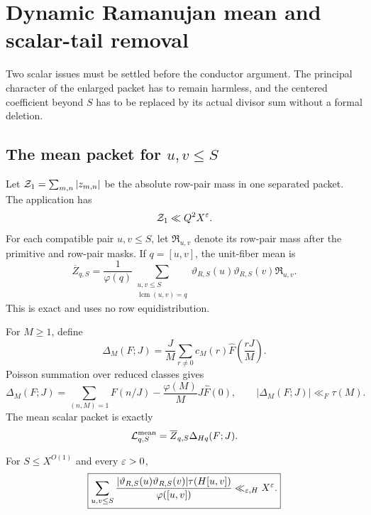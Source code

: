 \section{Dynamic Ramanujan mean and scalar-tail removal}
\label{sec:dynamic-mean}

Two scalar issues must be settled before the conductor argument.  The
principal character of the enlarged packet has to remain harmless, and
the centered coefficient beyond \(S\) has to be replaced by its actual
divisor sum without a formal deletion.

\subsection{The mean packet for
\texorpdfstring{\(u,v\le S\)}{u,v <= S}}

Let \(\mathcal Z_1=\sum_{m,n}|z_{m,n}|\) be the absolute row-pair mass in one
separated packet.  The application has
\begin{equation}
 \mathcal Z_1\ll Q^2X^\varepsilon.
 \label{eq:row-l1}
\end{equation}
For each compatible pair \(u,v\le S\), let
\(\mathfrak R_{u,v}\) denote its row-pair mass after the primitive and
row-pair masks.  If \(q=[u,v]\), the unit-fiber mean is
\begin{equation}
 \overline Z_{q,S}
 =\frac1{\varphi(q)}
 \sum_{\substack{u,v\le S\\\operatorname{lcm}(u,v)=q}}
 \vartheta_{R,S}(u)\vartheta_{R,S}(v)\mathfrak R_{u,v}.
 \label{eq:dynamic-fiber-mean}
\end{equation}
This is exact and uses no row equidistribution.

For \(M\ge1\), define
\begin{equation}
 \Delta_M(F;J)
 =\frac JM\sum_{r\ne0}c_M(r)
   \widehat F\left(\frac{rJ}{M}\right).
 \label{eq:Delta}
\end{equation}
Poisson summation over reduced classes gives
\begin{equation}
 \Delta_M(F;J)
 =\sum_{(n,M)=1}F(n/J)
  -\frac{\varphi(M)}M J\widehat F(0),
 \qquad |\Delta_M(F;J)|\ll_F\tau(M).
 \label{eq:Delta-bound}
\end{equation}
The mean scalar packet is exactly
\begin{equation}
 \mathcal L_{q,S}^{\rm mean}=\overline Z_{q,S}\Delta_{Hq}(F;J).
 \label{eq:mean-physical}
\end{equation}

\begin{lemma}
\label{lem:dynamic-lcm-cost}
For \(S\le X^{O(1)}\) and every \(\varepsilon>0\),
\begin{equation}
 \boxed{
 \sum_{u,v\le S}
 \frac{|\vartheta_{R,S}(u)\vartheta_{R,S}(v)|
       \tau(H[u,v])}{\varphi([u,v])}
 \ll_{\varepsilon,H}X^\varepsilon.}
 \label{eq:dynamic-lcm-cost}
\end{equation}
\end{lemma}


